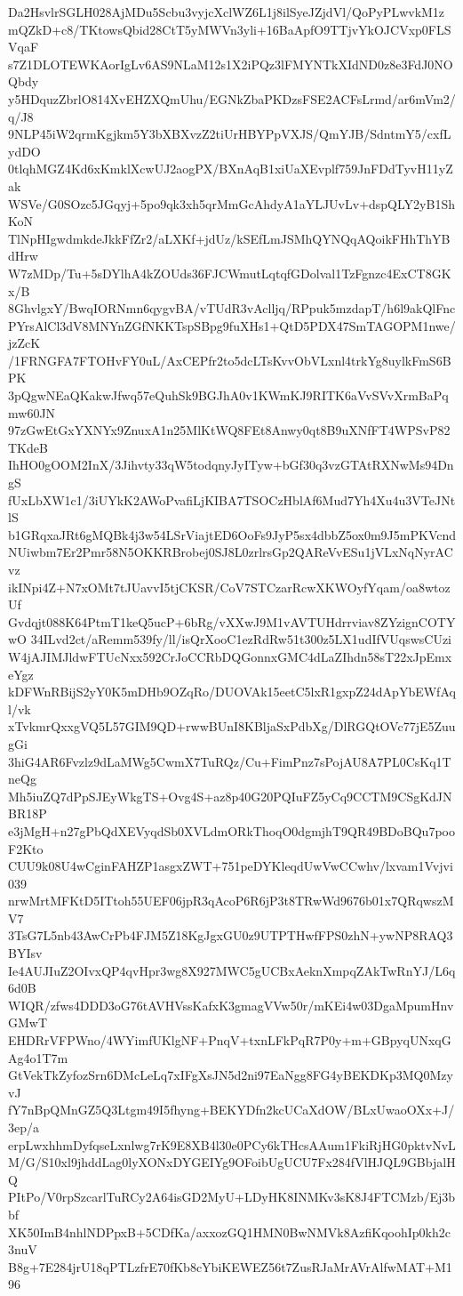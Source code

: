 Da2HsvlrSGLH028AjMDu5Scbu3vyjcXclWZ6L1j8ilSyeJZjdVl/QoPyPLwvkM1z
mQZkD+c8/TKtowsQbid28CtT5yMWVn3yli+16BaApfO9TTjvYkOJCVxp0FLSVqaF
s7Z1DLOTEWKAorIgLv6AS9NLaM12s1X2iPQz3lFMYNTkXIdND0z8e3FdJ0NOQbdy
y5HDquzZbrlO814XvEHZXQmUhu/EGNkZbaPKDzsFSE2ACFsLrmd/ar6mVm2/q/J8
9NLP45iW2qrmKgjkm5Y3bXBXvzZ2tiUrHBYPpVXJS/QmYJB/SdntmY5/cxfLydDO
0tlqhMGZ4Kd6xKmklXcwUJ2aogPX/BXnAqB1xiUaXEvplf759JnFDdTyvH11yZak
WSVe/G0SOzc5JGqyj+5po9qk3xh5qrMmGcAhdyA1aYLJUvLv+dspQLY2yB1ShKoN
TlNpHIgwdmkdeJkkFfZr2/aLXKf+jdUz/kSEfLmJSMhQYNQqAQoikFHhThYBdHrw
W7zMDp/Tu+5sDYlhA4kZOUds36FJCWmutLqtqfGDolval1TzFgnzc4ExCT8GKx/B
8GhvlgxY/BwqIORNmn6qygvBA/vTUdR3vAclljq/RPpuk5mzdapT/h6l9akQlFnc
PYrsAlCl3dV8MNYnZGfNKKTspSBpg9fuXHs1+QtD5PDX47SmTAGOPM1nwe/jzZcK
/1FRNGFA7FTOHvFY0uL/AxCEPfr2to5dcLTsKvvObVLxnl4trkYg8uylkFmS6BPK
3pQgwNEaQKakwJfwq57eQuhSk9BGJhA0v1KWmKJ9RITK6aVvSVvXrmBaPqmw60JN
97zGwEtGxYXNYx9ZnuxA1n25MlKtWQ8FEt8Anwy0qt8B9uXNfFT4WPSvP82TKdeB
IhHO0gOOM2InX/3Jihvty33qW5todqnyJyITyw+bGf30q3vzGTAtRXNwMs94DngS
fUxLbXW1c1/3iUYkK2AWoPvafiLjKIBA7TSOCzHblAf6Mud7Yh4Xu4u3VTeJNtlS
b1GRqxaJRt6gMQBk4j3w54LSrViajtED6OoFs9JyP5sx4dbbZ5ox0m9J5mPKVcnd
NUiwbm7Er2Pmr58N5OKKRBrobej0SJ8L0zrlrsGp2QAReVvESu1jVLxNqNyrACvz
ikINpi4Z+N7xOMt7tJUavvI5tjCKSR/CoV7STCzarRcwXKWOyfYqam/oa8wtozUf
Gvdqjt088K64PtmT1keQ5ucP+6bRg/vXXwJ9M1vAVTUHdrrviav8ZYzignCOTYwO
34ILvd2ct/aRemm539fy/ll/isQrXooC1ezRdRw51t300z5LX1udIfVUqswsCUzi
W4jAJIMJldwFTUcNxx592CrJoCCRbDQGonnxGMC4dLaZIhdn58sT22xJpEmxeYgz
kDFWnRBijS2yY0K5mDHb9OZqRo/DUOVAk15eetC5lxR1gxpZ24dApYbEWfAql/vk
xTvkmrQxxgVQ5L57GIM9QD+rwwBUnI8KBljaSxPdbXg/DlRGQtOVc77jE5ZuugGi
3hiG4AR6Fvzlz9dLaMWg5CwmX7TuRQz/Cu+FimPnz7sPojAU8A7PL0CsKq1TneQg
Mh5iuZQ7dPpSJEyWkgTS+Ovg4S+az8p40G20PQIuFZ5yCq9CCTM9CSgKdJNBR18P
e3jMgH+n27gPbQdXEVyqdSb0XVLdmORkThoqO0dgmjhT9QR49BDoBQu7pooF2Kto
CUU9k08U4wCginFAHZP1asgxZWT+751peDYKleqdUwVwCCwhv/lxvam1Vvjvi039
nrwMrtMFKtD5ITtoh55UEF06jpR3qAcoP6R6jP3t8TRwWd9676b01x7QRqwszMV7
3TsG7L5nb43AwCrPb4FJM5Z18KgJgxGU0z9UTPTHwfFPS0zhN+ywNP8RAQ3BYIsv
Ie4AUJIuZ2OIvxQP4qvHpr3wg8X927MWC5gUCBxAeknXmpqZAkTwRnYJ/L6q6d0B
WIQR/zfws4DDD3oG76tAVHVssKafxK3gmagVVw50r/mKEi4w03DgaMpumHnvGMwT
EHDRrVFPWno/4WYimfUKlgNF+PnqV+txnLFkPqR7P0y+m+GBpyqUNxqGAg4o1T7m
GtVekTkZyfozSrn6DMcLeLq7xIFgXsJN5d2ni97EaNgg8FG4yBEKDKp3MQ0MzyvJ
fY7nBpQMnGZ5Q3Ltgm49I5fhyng+BEKYDfn2kcUCaXdOW/BLxUwaoOXx+J/3ep/a
erpLwxhhmDyfqseLxnlwg7rK9E8XB4l30e0PCy6kTHcsAAum1FkiRjHG0pktvNvL
M/G/S10xl9jhddLag0lyXONxDYGEIYg9OFoibUgUCU7Fx284fVlHJQL9GBbjalHQ
PItPo/V0rpSzcarlTuRCy2A64isGD2MyU+LDyHK8INMKv3sK8J4FTCMzb/Ej3bbf
XK50ImB4nhlNDPpxB+5CDfKa/axxozGQ1HMN0BwNMVk8AzfiKqoohIp0kh2c3nuV
B8g+7E284jrU18qPTLzfrE70fKb8cYbiKEWEZ56t7ZusRJaMrAVrAlfwMAT+M196
